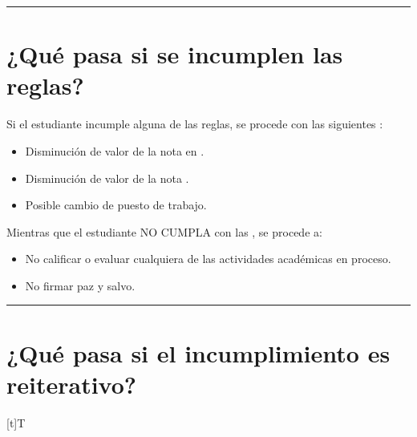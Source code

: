 \documentclass[letterpaper,10pt,spanish]{sphinxmanual}
\let\sphinxpxdimen\pdfpxdimen\else\newdimen\sphinxpxdimen
\begin{document}
\bigskip\hrule\bigskip



\section{¿Qué pasa si se incumplen las reglas?}
\label{\detokenize{0_intro/reglas:que-pasa-si-se-incumplen-las-reglas}}
\sphinxAtStartPar
Si el estudiante incumple alguna de las reglas, se procede con las siguientes :
\begin{itemize}
\item {} 
\sphinxAtStartPar
Disminución de valor de la nota en .

\item {} 
\sphinxAtStartPar
Disminución de valor de la nota .

\item {} 
\sphinxAtStartPar
Posible cambio de puesto de trabajo.

\end{itemize}

\sphinxAtStartPar
Mientras que el estudiante NO CUMPLA con las , se procede a:
\begin{itemize}
\item {} 
\sphinxAtStartPar
No calificar o evaluar cualquiera de las actividades académicas en proceso.

\item {} 
\sphinxAtStartPar
No firmar paz y salvo.

\end{itemize}


\bigskip\hrule\bigskip



\section{¿Qué pasa si el incumplimiento es reiterativo?}
\label{\detokenize{0_intro/reglas:que-pasa-si-el-incumplimiento-es-reiterativo}}

\begin{savenotes}\sphinxattablestart
\sphinxthistablewithglobalstyle
\centering
\begin{tabulary}{\linewidth}[t]{T}
\sphinxtoprule
\sphinxtableatstartofbodyhook

\begin{sphinxfigure-in-table}
\centering
\capstart
\noindent\sphinxincludegraphics[width=300\sphinxpxdimen]{{image011}.png}
\label{\detokenize{0_intro/reglas:id1}}\end{sphinxfigure-in-table}\relax
\\
\sphinxbottomrule
\end{tabulary}
\sphinxtableafterendhook\par
\sphinxattableend\end{savenotes}
\end{document}
